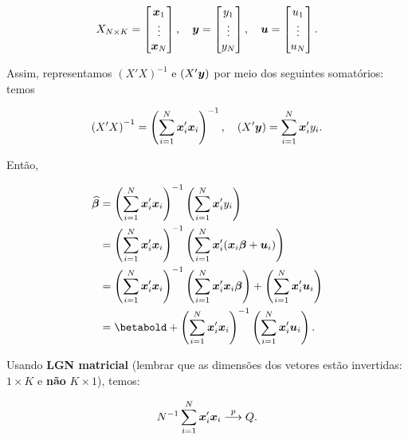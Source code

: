 \documentclass[11pt,oneside,a4paper]{article}
\numberwithin{equation}{section}
\begin{document}
\vspace{-1 em}
\begin{align*}
X_{N \times K} =
\begin{bmatrix}
	\boldsymbol{x}_{1} \\ \vdots \\	\boldsymbol{x}_{N}	
\end{bmatrix},
\quad
\boldsymbol{y} =
\begin{bmatrix}
	y_{1} \\ \vdots \\ y_{N}
\end{bmatrix},
\quad
\boldsymbol{u} =
\begin{bmatrix}
	u_{1} \\ \vdots \\ u_{N}
\end{bmatrix}.
\end{align*}

\noindent
Assim, representamos $(X'X)^{-1}$ e $(X'\boldsymbol{y})$ por meio dos seguintes somatórios:
temos

\vspace{-1 em}
\begin{align*}
\left( X'X \right)^{-1} = \left( \sum_{i=1}^{N} \boldsymbol{x}_{i}' \boldsymbol{x}_{i} \right)^{-1} ,
\quad
\left( X'\boldsymbol{y} \right) = \sum_{i=1}^{N} \boldsymbol{x}_{i}' y_{i}.
\end{align*}

Então,

\begin{align*}
\betahatbold &= 
\left( \sum_{i=1}^{N} \mbs{x}_{i}' \mbs{x}_{i} \right)^{-1}
\left( \sum_{i=1}^{N} \mbs{x}_{i}' y_{i} \right)
\\
&=
\left( \sum_{i=1}^{N} \mbs{x}_{i}' \mbs{x}_{i} \right)^{-1}
\left( \sum_{i=1}^{N} \mbs{x}_{i}' (\mbs{x}_{i} \mbs{\beta} + \mbs{u}_{i}) \right)
\\
&=
\left( \sum_{i=1}^{N} \mbs{x}_{i}' \mbs{x}_{i} \right)^{-1}
\left( \sum_{i=1}^{N} \mbs{x}_{i}' \mbs{x}_{i} \mbs{\beta} \right) +
\left( \sum_{i=1}^{N} \mbs{x}_{i}' \mbs{u}_{i} \right)
\\
&=
\betabold +
\left( \sum_{i=1}^{N} \mbs{x}_{i}' \mbs{x}_{i} \right)^{-1}
\left( \sum_{i=1}^{N} \mbs{x}_{i}' \mbs{u}_{i} \right).
\end{align*}

\noindent
Usando \textbf{LGN matricial} (lembrar que as dimensões dos vetores estão invertidas: $1 \times K$ e \textbf{não} $K \times 1$), temos:

\vspace{-1 em}
\begin{align*}
	N^{-1} \sum_{i=1}^{N} \boldsymbol{x}_{i}' \boldsymbol{x}_{i}
	 \overset{p}{\longrightarrow}  Q.
\end{align*}
\end{document}
